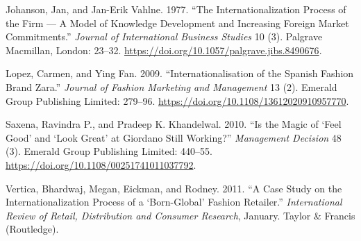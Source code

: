 \documentclass[hyperref, a4paper]{ctexart}
\begin{document}
\leavevmode\hypertarget{ref-innovative14}{}%
Johanson, Jan, and Jan-Erik Vahlne. 1977. ``The Internationalization
Process of the Firm --- A Model of Knowledge Development and Increasing
Foreign Market Commitments.'' \emph{Journal of International Business
Studies} 10 (3). Palgrave Macmillan, London: 23--32.
\url{https://doi.org/10.1057/palgrave.jibs.8490676}.

\leavevmode\hypertarget{ref-innovative16}{}%
Lopez, Carmen, and Ying Fan. 2009. ``Internationalisation of the Spanish
Fashion Brand Zara.'' \emph{Journal of Fashion Marketing and Management}
13 (2). Emerald Group Publishing Limited: 279--96.
\url{https://doi.org/10.1108/13612020910957770}.

\leavevmode\hypertarget{ref-innovative15}{}%
Saxena, Ravindra P., and Pradeep K. Khandelwal. 2010. ``Is the Magic of
`Feel Good' and `Look Great' at Giordano Still Working?''
\emph{Management Decision} 48 (3). Emerald Group Publishing Limited:
440--55. \url{https://doi.org/10.1108/00251741011037792}.

\leavevmode\hypertarget{ref-innovative6}{}%
Vertica, Bhardwaj, Megan, Eickman, and Rodney. 2011. ``A Case Study on
the Internationalization Process of a `Born-Global' Fashion Retailer.''
\emph{International Review of Retail, Distribution and Consumer
Research}, January. Taylor \& Francis (Routledge).
\end{document}
